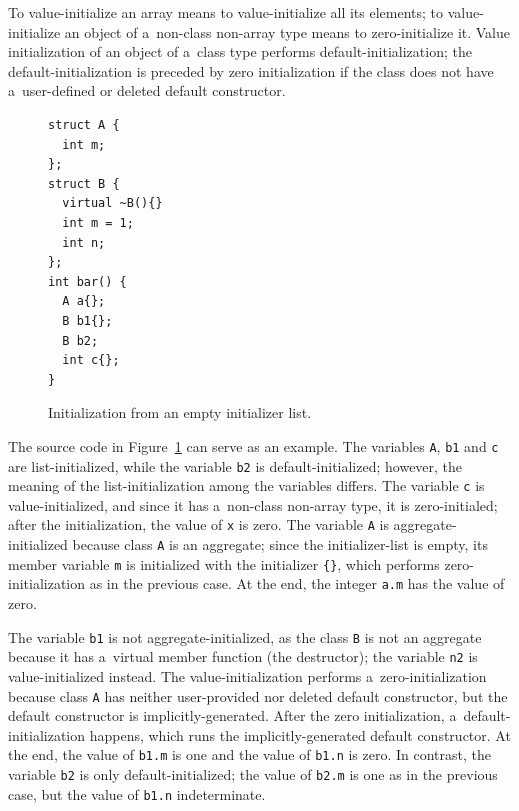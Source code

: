 \documentclass[nolot,nolof,nocover,printed]{fithesis3}
\begin{document}
To value-initialize an array means to value-initialize all its elements; to value-initialize an object of a~non-class non-array type means to zero-initialize it. Value initialization of an object of a~class type performs default-initialization; the default-initialization is preceded by zero initialization if the class does not have a~user-defined or deleted default constructor.

\begin{figure}
\begin{lstlisting}
struct A {
  int m;
};
struct B {
  virtual ~B(){}
  int m = 1;
  int n;
};
int bar() {
  A a{};
  B b1{};
  B b2;
  int c{};
}
\end{lstlisting}
\caption{Initialization from an empty initializer list.}
\label{fig:valueInit}
\end{figure}

The source code in Figure~\ref{fig:valueInit} can serve as an example. The variables \lstinline|A|, \lstinline|b1| and \lstinline|c| are list-initialized, while the variable \lstinline|b2| is default-initialized; however, the meaning of the list-initialization among the variables differs. The variable \lstinline|c| is value-initialized, and since it has a~non-class non-array type, it is zero-initialed; after the initialization, the value of \lstinline|x| is zero. The variable \lstinline|A| is aggregate-initialized because class \lstinline|A| is an aggregate; since the initializer-list is empty, its member variable \lstinline|m| is initialized with the initializer \lstinline|{}|, which performs zero-initialization as in the previous case. At the end, the integer \lstinline|a.m| has the value of zero.

The variable \lstinline|b1| is not aggregate-initialized, as the class \lstinline|B| is not an aggregate because it has a~virtual member function (the destructor); the variable \lstinline|n2| is value-initialized instead. The value-initialization performs a~zero-initialization because class \lstinline|A| has neither user-provided nor deleted default constructor, but the default constructor is implicitly-generated. After the zero initialization, a~default-initialization happens, which runs the implicitly-generated default constructor. At the end, the value of \lstinline|b1.m| is one and the value of \lstinline|b1.n| is zero.
In contrast, the variable \lstinline|b2| is only default-initialized; the value of \lstinline|b2.m| is one as in the previous case, but the value of \lstinline|b1.n| indeterminate.
\end{document}
